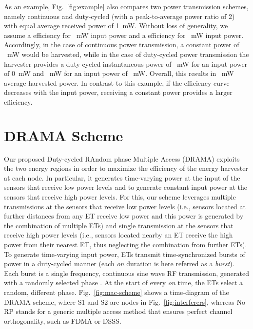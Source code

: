 \documentclass[conference]{IEEEtran}
\begin{document}
As an example, Fig.~\ref{fig:example} also compares two power transmission schemes, namely continuous and duty-cycled (with a peak-to-average power ratio of 2) with equal average received power of 1~mW. Without loss of generality, we assume a  efficiency for ~mW input power and a  efficiency for ~mW input power.  Accordingly, in the case of continuous power transmission, a constant power of ~mW would be harvested, while in the case of duty-cycled power transmission the harvester provides a duty cycled instantaneous power of ~mW for an input power of 0~mW and ~mW for an input power of ~mW. Overall, this results in ~mW average harvested power. In contrast to this example, if the efficiency curve decreases with the input power, receiving a constant power provides a larger efficiency.

\section{DRAMA Scheme}


Our proposed Duty-cycled RAndom phase Multiple Access (DRAMA) exploits the two energy regions in order to maximize the efficiency of the energy harvester at each node. In particular, it
 generates time-varying power at the input of the sensors that receive low power levels and to generate constant input power at the sensors that receive high power levels. For this, our scheme leverages multiple transmissions at the sensors that receive low power levels (i.e., sensors located at further distances from any ET receive low power and this power is generated by the combination of multiple ETs) and single transmission at the sensors that receive high power levels (i.e., sensors located nearby an ET receive the high power from their nearest ET, thus neglecting the combination from further ETs).
To generate time-varying input power, ETs transmit time-synchronized bursts of power in a duty-cycled manner (each {\em on} duration is here referred as a \emph{burst}). Each burst is a single frequency, continuous sine wave RF transmission, generated with a randomly selected phase . At the start of every \emph{on} time, the ETs select a random, different phase. Fig.~\ref{fig:mac-scheme} shows a time-diagram of the DRAMA scheme, where S1 and S2 are nodes in Fig.~\ref{fig:interferers}, whereas No RP stands for a generic multiple access method that ensures perfect channel orthogonality, such as FDMA or DSSS.
\end{document}
